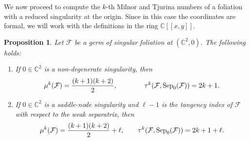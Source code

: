 \documentclass[12pt,letterpaper]{amsart}
\newcommand{\C}{\mathbb{C}}
\newcommand{\F}{\mathcal{F}}
\newcommand{\sep}{\mbox{\rm Sep}}
\newtheorem{proposition}[theorem]{Proposition}
\begin{document}
\par We now proceed to compute the $k$-th Milnor and Tjurina numbers of a foliation with a reduced singularity at the origin. Since in this case the coordinates are formal, we will work with the definitions in the ring $\C[[x,y]]$.
\begin{proposition}
Let $\F$ be a germ of singular foliation at $(\C^2,0)$. The following holds:  
\begin{enumerate}
    \item If $0\in\C^2$ is a non-degenerate singularity, then 
    \[\mu^{k}(\mathcal{F})= \frac{(k+1)(k+2)}{2},\qquad\qquad \tau^{k} (\mathcal{F}, \sep_0(\F))  = 2k + 1.\]
    \item If $0\in\C^2$ is a saddle-node singularity and $\ell-1$ is the tangency index of $\F$ with respect to the weak separatrix, then  \[\mu^{k}(\mathcal{F}) = \frac{(k+1)(k+2)}{2}  + \ell,\qquad \tau^{k} (\mathcal{F}, \sep_0(\F)) =  2k + 1 + \ell.\]
\end{enumerate}

\end{proposition}
\end{document}
